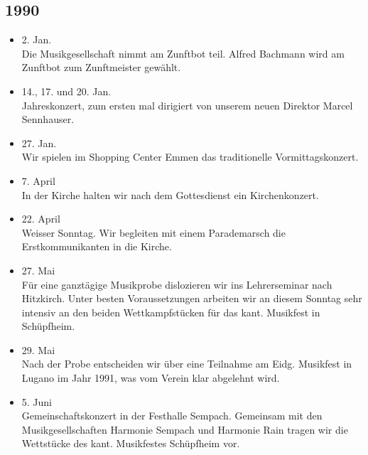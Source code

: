 \subsection{1990}

\begin{history}


    \begin{itemize}

        \item 2. Jan.\\
              Die Musikgesellschaft nimmt am Zunftbot teil. Alfred Bachmann wird am
              Zunftbot zum Zunftmeister gewählt.

        \item 14., 17. und 20. Jan.\\
              Jahreskonzert, zum ersten mal dirigiert von unserem neuen Direktor
              Marcel Sennhauser.

        \item 27. Jan.\\
              Wir spielen im Shopping Center Emmen das traditionelle
              Vormittagskonzert.

        \item 7. April\\
              In der Kirche halten wir nach dem Gottesdienst ein Kirchenkonzert.

        \item 22. April\\
              Weisser Sonntag. Wir begleiten mit einem Parademarsch die
              Erstkommunikanten in die Kirche.

        \item 27. Mai\\
              Für eine ganztägige Musikprobe dislozieren wir ins Lehrerseminar nach
              Hitzkirch. Unter besten Voraussetzungen arbeiten wir an diesem Sonntag
              sehr intensiv an den beiden Wettkampfstücken für das kant. Musikfest in
              Schüpfheim.

        \item 29. Mai\\
              Nach der Probe entscheiden wir über eine Teilnahme am Eidg. Musikfest in
              Lugano im Jahr 1991, was vom Verein klar abgelehnt wird.

        \item 5. Juni\\
              Gemeinschaftskonzert in der Festhalle Sempach. Gemeinsam mit den
              Musikgesellschaften Harmonie Sempach und Harmonie Rain tragen wir die
              Wettstücke des kant. Musikfestes Schüpfheim vor.


\end{itemize}
\end{history}

